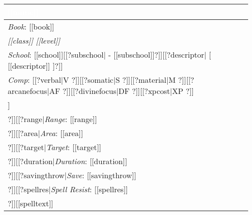 \noindent
\begin{supertabular}{p{9cm}}
\vspace{1mm}\sf\Large\textbf{\textcolor{white}{[[name]]}} \\
\hline
\textit{Book}: [[book]] \\
\hline
\textit{[[class]] [[level]]}\\
\hline
\textit{School}: [[school]][[?subschool| - [[subschool]]?]][[?descriptor| [ [[descriptor]] ]?]]\\
\hline
\textit{Comp}: [[?verbal|V ?]][[?somatic|S ?]][[?material|M ?]][[?arcanefocus|AF ?]][[?divinefocus|DF ?]][[?xpcost|XP ?]]\\
\hline
[[?castingtime|\textit{Casting Time}: [[castingtime]] \\
\hline
?]][[?range|\textit{Range}: [[range]] \\
\hline
?]][[?area|\textit{Area}: [[area]] \\
\hline
?]][[?target|\textit{Target}: [[target]] \\
\hline
?]][[?duration|\textit{Duration}: [[duration]] \\
\hline
?]][[?savingthrow|\textit{Save}: [[savingthrow]] \\
\hline
?]][[?spellres|\textit{Spell Resist}: [[spellres]] \\
\hline
?]][[spelltext]]\\
\end{supertabular}


